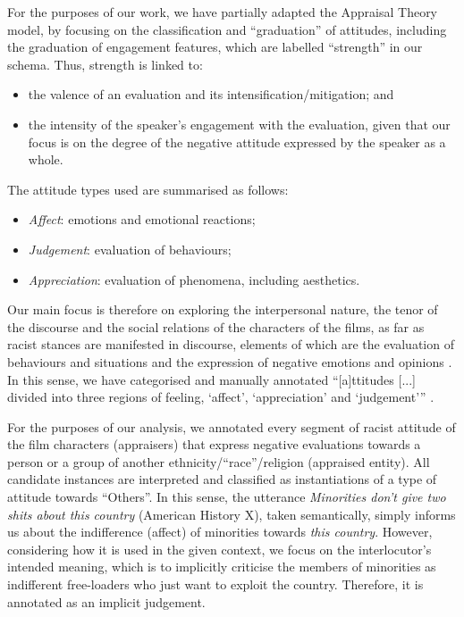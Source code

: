 \documentclass[output=paper]{LSP/langsci}
\begin{document}
For the purposes of our work, we have partially adapted the Appraisal Theory model, by focusing on the classification and “graduation” of attitudes, including the graduation of engagement features, which are labelled “strength” in our schema. Thus, strength is linked to:

\begin{itemize}
\item the valence of an evaluation and its intensification/mitigation; and
\item the intensity of the speaker's engagement with the evaluation, given that our focus is on the degree of the negative attitude expressed by the speaker as a whole.
\end{itemize}

The attitude types used are summarised as follows:
\begin{itemize}
\item \textit{Affect}: emotions and emotional reactions;
\item \textit{Judgement}: evaluation of behaviours;
\item \textit{Appreciation}: evaluation of phenomena, including aesthetics.
\end{itemize}

Our main focus is therefore on exploring the interpersonal nature, the tenor of the discourse and the social relations of the characters of the films, as far as racist stances are manifested in discourse, elements of which are the evaluation of behaviours and situations and the expression of negative emotions and opinions \citep[see][]{Fotopoulou2009}. In this sense, we have categorised and manually annotated “[a]ttitudes [...] divided into three regions of feeling, ‘affect’, ‘appreciation’ and ‘judgement’” \citep[35-43]{MartinWhite2005}. 

For the purposes of our analysis, we annotated every segment of racist attitude of the film characters (appraisers) that express negative evaluations towards a person or a group of another ethnicity/“race”/religion (appraised entity). All candidate instances are interpreted and classified as instantiations of a type of attitude towards “Others”. In this sense, the utterance \textit{Minorities don't give two shits about this country} (American History X), taken semantically, simply informs us about the indifference (affect) of minorities towards \textit{this country}. However, considering how it is used in the given context, we focus on the interlocutor’s intended meaning, which is to implicitly criticise the members of minorities as indifferent free-loaders who just want to exploit the country. Therefore, it is annotated as an implicit judgement.
\end{document}
